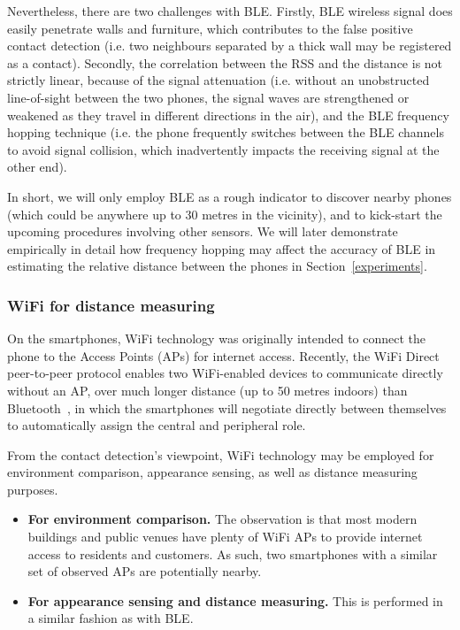 \documentclass[graybox]{svmult}
\begin{document}
Nevertheless, there are two challenges with BLE. Firstly, BLE wireless signal does easily penetrate walls and furniture, which contributes to the false positive contact detection (i.e. two neighbours separated by a thick wall may be registered as a contact). Secondly, the correlation between the RSS and the distance is not strictly linear, because of the signal attenuation (i.e. without an unobstructed line-of-sight between the two phones, the signal waves are strengthened or weakened as they travel in different directions in the air), and the BLE frequency hopping technique (i.e. the phone frequently switches between the BLE channels to avoid signal collision, which inadvertently impacts the receiving signal at the other end).

In short, we will only employ BLE as a rough indicator to discover nearby phones (which could be anywhere up to 30 metres in the vicinity), and to kick-start the upcoming procedures involving other sensors. We will later demonstrate empirically in detail how frequency hopping may affect the accuracy of BLE in estimating the relative distance between the phones in Section~\ref{experiments}.


\subsubsection{WiFi for distance measuring}
\label{WiFi}
On the smartphones, WiFi technology was originally intended to connect the phone to the Access Points (APs) for internet access. Recently, the WiFi Direct peer-to-peer protocol enables two WiFi-enabled devices to communicate directly without an AP, over much longer distance (up to 50 metres indoors) than Bluetooth~\cite{khan2017wi}, in which the smartphones will negotiate directly between themselves to automatically assign the central and peripheral role.

From the contact detection's viewpoint, WiFi technology may be employed for environment comparison, appearance sensing, as well as distance measuring purposes.
\begin{itemize}
    \item \textbf{For environment comparison.} The observation is that most modern buildings and public venues have plenty of WiFi APs to provide internet access to residents and customers. As such, two smartphones with a similar set of observed APs are potentially nearby.
    
    \item \textbf{For appearance sensing and distance measuring.} This is performed in a similar fashion as with BLE.
\end{itemize}
\end{document}
